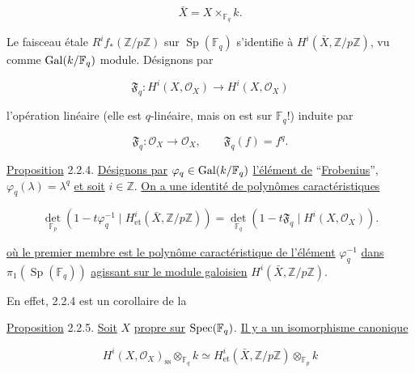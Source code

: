 \begin{equation}\tag{2.2.1}
\bar X=X\times_{\mathbb F_q}k.
\end{equation}

Le faisceau étale $R^if_*(\mathbb Z/p\mathbb Z)$ sur
$\operatorname{Sp}(\mathbb F_q)$ s'identifie à
$H^i(\bar X,\mathbb Z/p\mathbb Z)$, vu comme
$\operatorname{Gal}(k/\mathbb F_q)$ module. Désignons par

\begin{equation}\tag{2.2.2}
\mathfrak F_q:H^i(X,\mathcal O_X)\longrightarrow H^i(X,\mathcal O_X)
\end{equation}

l'opération linéaire (elle est $q$-linéaire, mais on est sur $\mathbb F_q$!)
induite par

\begin{equation}\tag{2.2.3}
\mathfrak F_q:\mathcal O_X\longrightarrow\mathcal O_X,
\qquad \mathfrak F_q(f)=f^q.
\end{equation}

\underline{Proposition} 2.2.4. \underline{Désignons par}
$\varphi_q\in\operatorname{Gal}(k/\mathbb F_q)$ \underline{l'élément de} ``\underline{Frobenius}'',
$\varphi_q(\lambda)=\lambda^q$ \underline{et soit} $i\in\mathbb Z$. \underline{On a une identité de
polynômes caractéristiques}

\begin{equation}\tag{2.2.4.1}
\det_{\mathbb F_p}\!\left(
1-t\varphi_q^{-1}\mid H^i_{\mathrm{et}}(\bar X,\mathbb Z/p\mathbb Z)
\right)
=
\det_{\mathbb F_q}\!\left(
1-t\mathfrak F_q\mid H^i(X,\mathcal O_X)
\right).
\end{equation}

\underline{où le premier membre est le polynôme caractéristique de l'élément}
$\varphi_q^{-1}$ \underline{dans} $\pi_1(\operatorname{Sp}(\mathbb F_q))$ \underline{agissant sur le
module galoisien} $H^i(\bar X,\mathbb Z/p\mathbb Z)$.

En effet, 2.2.4 est un corollaire de la


\underline{Proposition} 2.2.5. \underline{Soit} $X$ \underline{propre sur}
$\operatorname{Spec}(\mathbb F_q)$. \underline{Il y a un isomorphisme canonique}

\begin{equation}\tag{2.2.6}
H^i(X,\mathcal O_X)_{\mathrm{ss}}\otimes_{\mathbb F_q}k
\simeq
H^i_{\mathrm{et}}(\bar X,\mathbb Z/p\mathbb Z)
\otimes_{\mathbb F_p}k
\end{equation}

